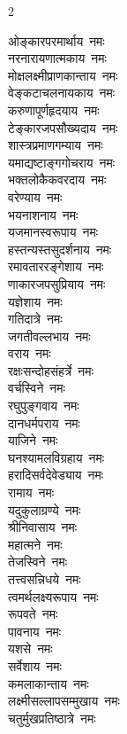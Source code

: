 \begin{multicols}{2}
    \begin{flushleft}
ओङ्कारपरमार्थाय~नमः\\
नरनारायणात्मकाय~नमः\\
मोक्षलक्ष्मीप्राणकान्ताय~नमः\\
वेङ्कटाचलनायकाय~नमः\\
करुणापूर्णहृदयाय~नमः\\
टेङ्कारजपसौख्यदाय~नमः\\
शास्त्रप्रमाणगम्याय~नमः\\
यमाद्यष्टाङ्गगोचराय~नमः\\
भक्तलोकैकवरदाय~नमः\\
वरेण्याय~नमः\hfill{}\\
                                                        
भयनाशनाय~नमः\\
यजमानस्वरूपाय~नमः\\
हस्तन्यस्तसुदर्शनाय~नमः\\
रमावताररङ्गेशाय~नमः\\
णाकारजपसुप्रियाय~नमः\\
यज्ञेशाय~नमः\\
गतिदात्रे~नमः\\
जगतीवल्लभाय~नमः\\
वराय~नमः\\
रक्षःसन्दोहसंहर्त्रे~नमः\hfill{}\\
                                                        
वर्चस्विने~नमः\\
रघुपुङ्गवाय~नमः\\
दानधर्मपराय~नमः\\
याजिने~नमः\\
घनश्यामलविग्रहाय~नमः\\
हरादिसर्वदेवेड्याय~नमः\\
रामाय~नमः\\
यदुकुलाग्रण्ये~नमः\\
श्रीनिवासाय~नमः\\
महात्मने~नमः\hfill{}\\
                                                        
तेजस्विने~नमः\\
तत्त्वसन्निधये~नमः\\
त्वमर्थलक्ष्यरूपाय~नमः\\
रूपवते~नमः\\
पावनाय~नमः\\
यशसे~नमः\\
सर्वेशाय~नमः\\
कमलाकान्ताय~नमः\\
लक्ष्मीसल्लापसम्मुखाय~नमः\\
चतुर्मुखप्रतिष्ठात्रे~नमः\hfill{}\\
                                                        

\end{flushleft}
\end{multicols}
